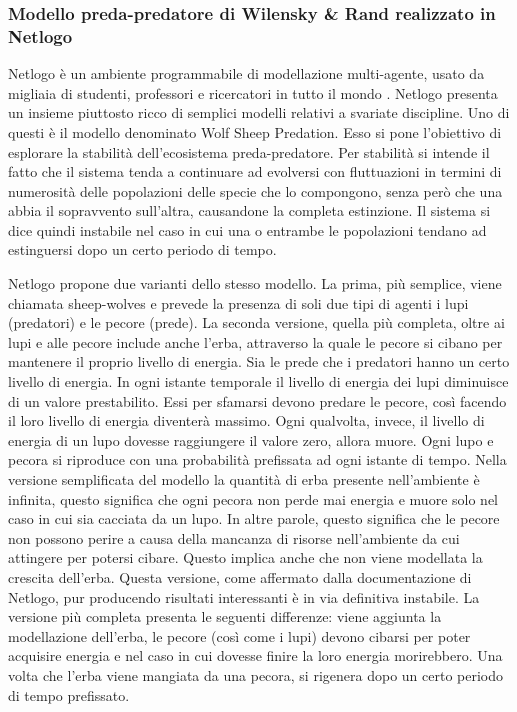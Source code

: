 \documentclass[11pt]{article}
\begin{document}
\subsubsection{Modello preda-predatore di Wilensky \& Rand realizzato in Netlogo}
Netlogo è un ambiente programmabile di modellazione multi-agente, usato da migliaia di studenti, professori e ricercatori in tutto il mondo \cite{Netlogo}. Netlogo presenta un insieme piuttosto ricco di semplici modelli relativi a svariate discipline. Uno di questi è il modello denominato Wolf Sheep Predation. Esso si pone l'obiettivo di esplorare la stabilità dell'ecosistema preda-predatore. Per stabilità si intende il fatto che il sistema tenda a continuare ad evolversi con fluttuazioni in termini di numerosità delle popolazioni delle specie che lo compongono, senza però che una abbia il sopravvento sull'altra, causandone la completa estinzione. Il sistema si dice quindi instabile nel caso in cui una o entrambe le popolazioni tendano ad estinguersi dopo un certo periodo di tempo.

Netlogo propone due varianti dello stesso modello. La prima, più semplice, viene chiamata sheep-wolves e prevede la presenza di soli due tipi di agenti i lupi (predatori) e le pecore (prede). La seconda versione, quella più completa, oltre ai lupi e alle pecore include anche l'erba, attraverso la quale le pecore si cibano per mantenere il proprio livello di energia. Sia le prede che i predatori hanno un certo livello di energia. In ogni istante temporale il livello di energia dei lupi diminuisce di un valore prestabilito. Essi per sfamarsi devono predare le pecore, così facendo il loro livello di energia diventerà massimo. Ogni qualvolta, invece, il livello di energia di un lupo dovesse raggiungere il valore zero, allora muore. Ogni lupo e pecora si riproduce con una probabilità prefissata ad ogni istante di tempo. Nella versione semplificata del modello la quantità di erba presente nell'ambiente è infinita, questo significa che ogni pecora non perde mai energia e muore solo nel caso in cui sia cacciata da un lupo. In altre parole, questo significa che le pecore non possono perire a causa della mancanza di risorse nell'ambiente da cui attingere per potersi cibare. Questo implica anche che non viene modellata la crescita dell'erba. Questa versione, come affermato dalla documentazione di Netlogo, pur producendo risultati interessanti è in via definitiva instabile. La versione più completa presenta le seguenti differenze: viene aggiunta la modellazione dell'erba, le pecore (così come i lupi) devono cibarsi per poter acquisire energia e nel caso in cui dovesse finire la loro energia morirebbero. Una volta che l'erba viene mangiata da una pecora, si rigenera dopo un certo periodo di tempo prefissato. 
\end{document}
